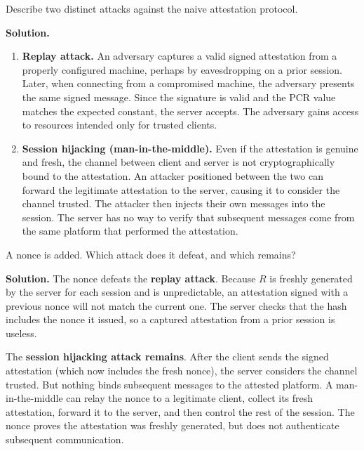 \documentclass[11pt]{article}
\begin{document}
\begin{task}\rm
  Describe two distinct attacks against the naive attestation protocol.
\end{task}

\noindent\textbf{Solution.}
\begin{enumerate}
\item \textbf{Replay attack.}  An adversary captures a valid signed
  attestation from a properly configured machine, perhaps by
  eavesdropping on a prior session.  Later, when connecting from a
  compromised machine, the adversary presents the same signed message.
  Since the signature is valid and the PCR value matches the expected
  constant, the server accepts.  The adversary gains access to
  resources intended only for trusted clients.

\item \textbf{Session hijacking (man-in-the-middle).}  Even if the
  attestation is genuine and fresh, the channel between client and
  server is not cryptographically bound to the attestation.  An
  attacker positioned between the two can forward the legitimate
  attestation to the server, causing it to consider the channel
  trusted.  The attacker then injects their own messages into the
  session.  The server has no way to verify that subsequent messages
  come from the same platform that performed the attestation.
\end{enumerate}

\begin{task}\rm
  A nonce is added.  Which attack does it defeat, and which remains?
\end{task}

\noindent\textbf{Solution.}
The nonce defeats the \textbf{replay attack}.  Because $R$ is freshly
generated by the server for each session and is unpredictable, an
attestation signed with a previous nonce will not match the current
one.  The server checks that the hash includes the nonce it issued,
so a captured attestation from a prior session is useless.

The \textbf{session hijacking attack remains}.  After the client sends
the signed attestation (which now includes the fresh nonce), the server
considers the channel trusted.  But nothing binds subsequent messages
to the attested platform.  A man-in-the-middle can relay the nonce to
a legitimate client, collect its fresh attestation, forward it to the
server, and then control the rest of the session.  The nonce proves
the attestation was freshly generated, but does not authenticate
subsequent communication.
\end{document}
